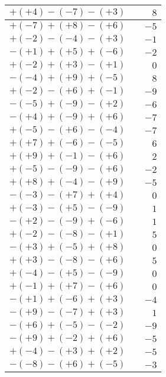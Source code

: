 \documentclass[a4paper,12pt]{scrartcl}
\begin{document}
\begin{center}
\begin{tabular}{|l|l|r|}
$+(+4)-(-7)-(+3)$ & & $8$\\ \hline                               
$+(-7)+(+8)-(+6)$ & & $-5$\\ \hline                              
$+(-2)-(-4)-(+3)$ & & $-1$\\ \hline                              
$-(+1)+(+5)+(-6)$ & & $-2$\\ \hline                              
$+(-2)+(+3)-(+1)$ & & $0$\\ \hline                               
$-(-4)+(+9)+(-5)$ & & $8$\\ \hline                               
$+(-2)-(+6)+(-1)$ & & $-9$\\ \hline                              
$-(-5)+(-9)-(+2)$ & & $-6$\\ \hline                              
$-(+4)+(-9)+(+6)$ & & $-7$\\ \hline                              
$+(-5)-(+6)-(-4)$ & & $-7$\\ \hline                              
$+(+7)+(-6)-(-5)$ & & $6$\\ \hline
$+(+9)+(-1)-(+6)$ & & $2$\\ \hline
$+(-5)-(-9)-(+6)$ & & $-2$\\ \hline
$+(+8)+(-4)-(+9)$ & & $-5$\\ \hline
$-(-3)-(+7)+(+4)$ & & $0$\\ \hline
$+(-3)-(+5)-(-9)$ & & $1$\\ \hline
$-(+2)-(-9)+(-6)$ & & $1$\\ \hline
$+(-2)-(-8)-(+1)$ & & $5$\\ \hline
$-(+3)+(-5)+(+8)$ & & $0$\\ \hline
$+(+3)-(-8)-(+6)$ & & $5$\\ \hline
$+(-4)-(+5)-(-9)$ & & $0$\\ \hline
$+(-1)+(+7)-(+6)$ & & $0$\\ \hline
$-(+1)+(-6)+(+3)$ & & $-4$\\ \hline
$-(+9)-(-7)+(+3)$ & & $1$\\ \hline
$-(+6)+(-5)-(-2)$ & & $-9$\\ \hline
$-(+9)+(-2)+(+6)$ & & $-5$\\ \hline
$+(-4)-(+3)+(+2)$ & & $-5$\\ \hline
$-(-8)-(+6)+(-5)$ & & $-3$\\\hline
\end{tabular}
\end{center}
\end{document}
